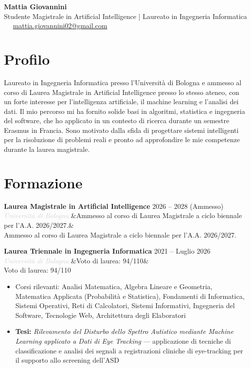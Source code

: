 \documentclass[a4paper,10pt]{article}
\newcommand{\entry}[4]{%
  \noindent\textbf{#1} \hfill \textcolor{accent}{#2}\\
  \textit{\textcolor{lightgray}{#3}}%
  \ifx&#4&\else\\\vspace{0.2em}#4\fi
  \vspace{0.5em}
}
\newcommand{\entrylist}[5]{%
  \noindent\textbf{#1} \hfill \textcolor{accent}{#2}\\
  \textit{\textcolor{lightgray}{#3}}%
  \ifx&#4&\else\\\vspace{0.2em}#4\fi
  \vspace{0.3em}
  \begin{itemize}#5\end{itemize}
  \vspace{0.3em}
}
\begin{document}
\begin{center}
  {\Huge\bfseries\color{darkgray} Mattia Giovannini}\\[0.4em]
  {\large\color{accent} Studente Magistrale in Artificial Intelligence | Laureato in Ingegneria Informatica}\\[0.7em]
  \textcolor{lightgray}{
    \faPhone\ \PrivatePhone
    \quad\textbullet\quad
    \faEnvelope\ \href{mailto:mattia.giovannini02@gmail.com}{mattia.giovannini02@gmail.com}
  }
\end{center}

\vspace{0.5em}

\section{Profilo}

Laureato in Ingegneria Informatica presso l’Università di Bologna e ammesso al corso di Laurea Magistrale in Artificial Intelligence presso lo stesso ateneo, con un forte interesse per l’intelligenza artificiale, il machine learning e l’analisi dei dati. Il mio percorso mi ha fornito solide basi in algoritmi, statistica e ingegneria del software, che ho applicato in un contesto di ricerca durante un semestre Erasmus in Francia. Sono motivato dalla sfida di progettare sistemi intelligenti per la risoluzione di problemi reali e pronto ad approfondire le mie competenze durante la laurea magistrale.

\section{Formazione}

\entry{Laurea Magistrale in Artificial Intelligence}{2026 -- 2028 (Ammesso)}{Università di Bologna}
{Ammesso al corso di Laurea Magistrale a ciclo biennale per l'A.A. 2026/2027.}

\entrylist{Laurea Triennale in Ingegneria Informatica}{2021 -- Luglio 2026}{Università di Bologna}{Voto di laurea: 94/110}{
  \item Corsi rilevanti: Analisi Matematica, Algebra Lineare e Geometria,
        Matematica Applicata (Probabilità e Statistica), Fondamenti di Informatica,
        Sistemi Operativi, Reti di Calcolatori, Sistemi Informativi,
        Ingegneria del Software, Tecnologie Web, Architettura degli Elaboratori
  \item \textbf{Tesi:} \textit{Rilevamento del Disturbo dello Spettro Autistico mediante Machine Learning applicato a Dati di Eye Tracking} — applicazione di tecniche di classificazione e analisi dei segnali a registrazioni cliniche di eye-tracking per il supporto allo screening dell’ASD
}
\end{document}
